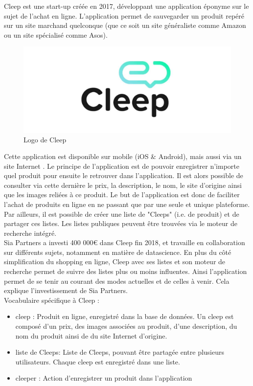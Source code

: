 \documentclass{article} %
\begin{document}
Cleep est une start-up créée en 2017, développant une application éponyme sur le sujet de l'achat en ligne. L'application permet de sauvegarder un produit repéré sur un site marchand quelconque (que ce soit un site généraliste comme Amazon ou un site spécialisé comme Asos). 
\begin{figure}
 \begin{center}
  \includegraphics[keepaspectratio = true,scale=0.2]{cleep.jpg}
 \end{center}
 \caption{Logo de Cleep}
\end{figure}
Cette application  est disponible sur mobile (iOS \& Android), mais aussi via un site Internet \cite{cleep}. Le principe de l'application est de pouvoir enregistrer n'importe quel produit pour ensuite le retrouver dans l'application. Il est alors possible de consulter via cette dernière le prix, la description, le nom, le site d'origine ainsi que les images reliées à ce produit. Le but de l'application est donc de faciliter l'achat de produits en ligne en ne passant que par une seule et unique plateforme. Par ailleurs, il est possible de créer une liste de "Cleeps" (i.e. de produit) et de partager ces listes. Les listes publiques peuvent être trouvées via le moteur de recherche intégré. \\
Sia Partners a investi 400 000€ dans Cleep fin 2018, et travaille en collaboration sur différents sujets, notamment en matière de datascience. En plus du côté simplification du shopping en ligne, Cleep avec ses listes et son moteur de recherche permet de suivre des listes plus ou moins influentes. Ainsi l'application permet de se tenir au courant des modes actuelles et de celles à venir. Cela explique l'investissement de Sia Partners.\\
Vocabulaire spécifique à Cleep :
\begin{itemize}
 \item cleep : Produit en ligne, enregistré dans la base de données. Un cleep est composé d'un prix, des images associées au produit, d'une description, du nom du produit ainsi de du site Internet d'origine.
 \item liste de Cleeps: Liste de Cleeps, pouvant être partagée entre plusieurs utilisateurs. Chaque cleep est enregistré dans une liste.
 \item cleeper : Action d'enregistrer un produit dans l'application
\end{itemize}
\end{document}
